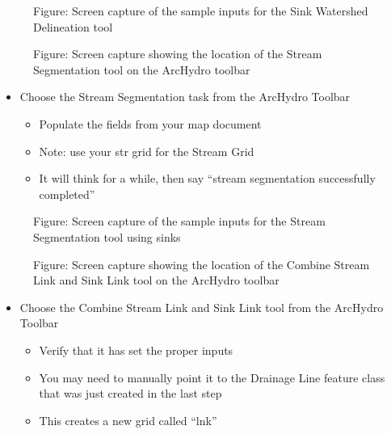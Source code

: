 \documentclass[letterpaper,10pt,english]{sphinxmanual}
\begin{document}
\begin{figure}[htbp]
\centering
\capstart

\noindent{}
\caption{Figure: Screen capture of the sample inputs for the Sink Watershed Delineation tool}\label{\detokenize{ex_2:id8}}\end{figure}

\begin{figure}[htbp]
\centering
\capstart

\noindent{}
\caption{Figure: Screen capture showing the location of the Stream Segmentation tool on the ArcHydro toolbar}\label{\detokenize{ex_2:id9}}\end{figure}
\begin{itemize}
\item {} 
Choose the Stream Segmentation task from the ArcHydro Toolbar
\begin{itemize}
\item {} 
Populate the fields from your map document

\item {} 
Note: use your str grid for the Stream Grid

\item {} 
It will think for a while, then say “stream segmentation successfully completed”

\end{itemize}

\end{itemize}

\begin{figure}[htbp]
\centering
\capstart

\noindent{}
\caption{Figure: Screen capture of the sample inputs for the Stream Segmentation tool using sinks}\label{\detokenize{ex_2:id10}}\end{figure}

\begin{figure}[htbp]
\centering
\capstart

\noindent{}
\caption{Figure: Screen capture showing the location of the Combine Stream Link and Sink Link tool on the ArcHydro toolbar}\label{\detokenize{ex_2:id11}}\end{figure}
\begin{itemize}
\item {} 
Choose the Combine Stream Link and Sink Link tool from the ArcHydro Toolbar
\begin{itemize}
\item {} 
Verify that it has set the proper inputs

\item {} 
You may need to manually point it to the Drainage Line feature class that was just created in the last step

\item {} 
This creates a new grid called “lnk”

\end{itemize}

\end{itemize}
\end{document}
